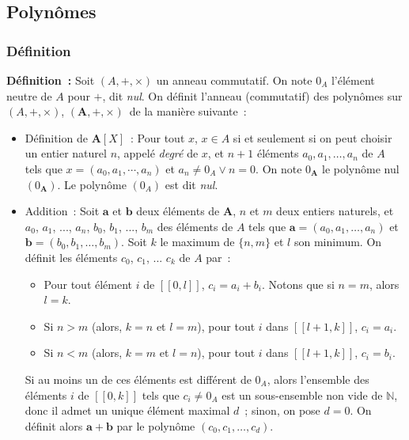 \subsection{Polynômes}

\subsubsection{Définition} 

\noindent\textbf{Définition :} Soit $(A, +, \times)$ un anneau commutatif. 
    On note $0_A$ l'élément neutre de $A$ pour $+$, dit \textit{nul}.
    On définit l'anneau (commutatif) des polynômes sur $(A, +, \times)$, $(\mathbf{A}, +, \times)$ de la manière suivante : 
    \begin{itemize}[nosep]
        \item Définition de $\mathbf{A}[X]$ : Pour tout $x$, $x \in A$ si et seulement si on peut choisir un entier naturel $n$, appelé \textit{degré} de $x$, et $n+1$ éléments $a_0, a_1, \dots, a_n$ de $A$ tels que $x = (a_0, a_1, \cdots, a_n)$ et $a_n \neq 0_A \vee n = 0$.
            On note $0_{\mathbf{A}}$ le polynôme nul $(0_{\mathbf{A}})$.
            Le polynôme $(0_A)$ est dit \textit{nul}.
        \item Addition : Soit $\mathbf{a}$ et $\mathbf{b}$ deux éléments de $\mathbf{A}$, $n$ et $m$ deux entiers naturels, et $a_0$, $a_1$, ..., $a_n$, $b_0$, $b_1$, ..., $b_m$ des éléments de $A$ tels que $\mathbf{a} = (a_0, a_1, \dots, a_n)$ et $\mathbf{b} = (b_0, b_1, \dots, b_m)$.
            Soit $k$ le maximum de $\lbrace n, m \rbrace$ et $l$ son minimum.
            On définit les éléments $c_0$, $c_1$, ... $c_k$ de $A$ par : 
            \begin{itemize}[nosep]
                \item Pour tout élément $i$ de $[\![0, l]\!]$, $c_i = a_i + b_i$.
                    Notons que si $n = m$, alors $l = k$.
                \item Si $n > m$ (alors, $k = n$ et $l = m$), pour tout $i$ dans $[\![l+1, k]\!]$, $c_i = a_i$.
                \item Si $n < m$ (alors, $k = m$ et $l = n$), pour tout $i$ dans $[\![l+1, k]\!]$, $c_i = b_i$.
            \end{itemize}
            Si au moins un de ces éléments est différent de $0_A$, alors l'ensemble des éléments $i$ de $[\![0, k]\!]$ tels que $c_i \neq 0_A$ est un sous-ensemble non vide de $\mathbb{N}$, donc il admet un unique élément maximal $d$ ; sinon, on pose $d = 0$.
            On définit alors $\mathbf{a} + \mathbf{b}$ par le polynôme $(c_0, c_1, \dots, c_d)$.

\end{itemize}
